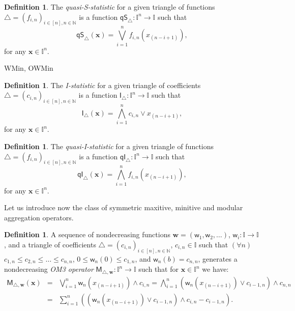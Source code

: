 \documentclass[11pt]{article}\usepackage{graphicx, color}
\renewcommand{\emph}[1]{\textsl{#1}}
\newcommand{\vect}[1]{{\mathbf{#1}}}
\newcommand{\func}[1]{{\mathsf{#1}}}
\newcommand{\Naturals}{\mathbb{N}}
\newcommand{\Ival}{\mathbb{I}}
\newcommand{\IvalPow}[1]{\mathbb{I}^{#1}}
\theoremstyle{remark}
\theoremstyle{definition}
\newtheorem{definition}[theorem]{Definition}
\begin{document}
\begin{definition}
The \emph{quasi-S-statistic} for a given triangle of functions $\triangle=(f_{i,n})_{ i\in [n],n\in\Naturals}$
is a function $\func{qS}_{\triangle}:\IvalPow{n}\to\Ival$ such that 
\[
\func{qS}_{\triangle}(\vect{x})=\bigvee_{i=1}^{n}f_{i,n}(x_{(n-i+1)}),
\] for any $\vect{x}\in\IvalPow{n}$.
\end{definition}


WMin, OWMin

\begin{definition}
The \emph{I-statistic} for a given triangle of coefficients $\triangle=(c_{i,n})_{ i\in [n],n\in\Naturals}$
is a function $\func{I}_{\triangle}:\IvalPow{n}\to\Ival$ such that 
\[
\func{I}_{\triangle}(\vect{x})=\bigwedge_{i=1}^{n}c_{i,n}\vee x_{(n-i+1)},
\] for any $\vect{x}\in\IvalPow{n}$.
\end{definition}

\begin{definition}
The \emph{quasi-I-statistic} for a given triangle of functions $\triangle=(f_{i,n})_{ i\in [n],n\in\Naturals}$
is a function $\func{qI}_{\triangle}:\IvalPow{n}\to\Ival$ such that 
\[
\func{qI}_{\triangle}(\vect{x})=\bigwedge_{i=1}^{n}f_{i,n}(x_{(n-i+1)}),
\] for any $\vect{x}\in\IvalPow{n}$.
\end{definition}

Let us introduce now the class of symmetric maxitive, minitive and modular aggregation operators.

\begin{definition}
A sequence of nondecreasing functions $\vect{w}=(\func{w}_1,\func{w}_2,\dots)$,
$\func{w}_i :\Ival\to\Ival$,
 and a triangle of coefficients
 $\triangle=(c_{i,n})_{i\in[n],n\in\Naturals}$, $c_{i,n}\in\Ival$
 such that $(\forall n)$ $c_{1,n}\le c_{2,n}\le \dots \le c_{n,n}$,
 $0\le\func{w}_n(0)\le c_{1,n}$, and
 $\func{w}_n(b)=c_{n,n}$,
 generates a nondecreasing \emph{OM3 operator} $\func{M}_{\triangle,\vect{w}}:\IvalPow{n}\to\Ival$
 such that for $\vect{x}\in\IvalPow{n}$ we have:
\begin{eqnarray*}
\func{M}_{\triangle,\vect{w}}(\mathbf{x})&=&\bigvee_{i=1}^n
\func{w}_n(x_{(n-i+1)})\wedge c_{i,n} =  \bigwedge_{i=1}^n (\func{w}_n(x_{(n-i+1)}) \vee c_{i-1,n}) \wedge c_{n,n}\\
&=& \sum_{i=1}^n \left(\left(\func{w}_n(x_{(n-i+1)})\vee c_{i-1,n}\right) \wedge
c_{i,n} - c_{i-1,n}\right).
\end{eqnarray*}
\end{definition}
\end{document}
